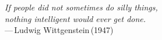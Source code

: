 
\thispagestyle{empty}


\vspace*{3cm}

\begin{center}{\slshape 
    If people did not sometimes do silly things,\\ 
    nothing intelligent would ever get done.} \\ \medskip
    ---\,Ludwig Wittgenstein\,(1947)
\end{center}

\bigskip
